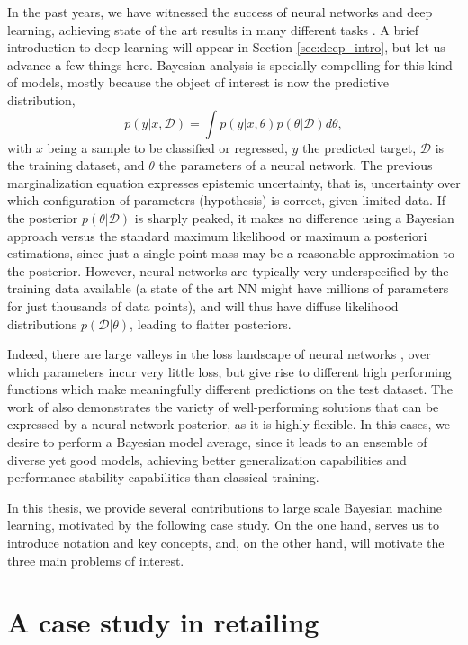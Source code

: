 In the past years, we have witnessed the success of neural networks and deep learning, achieving state of the art results in many different tasks \parencite{lecun2015deep}. A brief introduction to deep learning will appear in Section \ref{sec:deep_intro}, but let us advance a few things here. Bayesian analysis is specially compelling for this kind of models, mostly because the object of interest  is now the predictive distribution,
$$
p(y|x, \mathcal{D}) = \int p(y|x,\theta) p (\theta| \mathcal{D}) d\theta,
$$
with $x$ being a sample to be classified or regressed, $y$ the predicted target, $\mathcal{D}$ is the training dataset, and $\theta$ the parameters of a neural network. The previous marginalization equation expresses epistemic uncertainty, that is, uncertainty over which configuration of parameters (hypothesis) is correct, given limited data. If the posterior $p(\theta| \mathcal{D})$ is sharply peaked, it makes no difference using a Bayesian approach versus the standard maximum likelihood or maximum a posteriori estimations, since just a single point mass may be a reasonable approximation to the posterior. However, neural networks are typically very underspecified by the training data available (a state of the art NN might have millions of parameters for just thousands of data points), and will thus have diffuse likelihood distributions $p(\mathcal{D}|\theta)$, leading to flatter posteriors.

Indeed, there are large valleys in the loss landscape of
neural networks \parencite{garipov2018loss}, over which parameters incur very little loss, but give rise to different high performing
functions which make meaningfully different predictions on the test dataset. The work of \parencite{ZOLNA2020102969}
also demonstrates the variety of well-performing solutions that can be expressed by a neural network
posterior, as it is highly flexible. In this cases, we desire to perform a Bayesian model average, since it leads to an ensemble of diverse yet good models, achieving better generalization capabilities and performance stability capabilities than classical training.

In this thesis, we provide several contributions to large scale Bayesian machine learning, motivated by the following case study. On the one hand, serves us to introduce notation and key concepts, and, on the other hand, will motivate the three main problems of interest.

\section{A case study in retailing}\label{sec:dlms}


